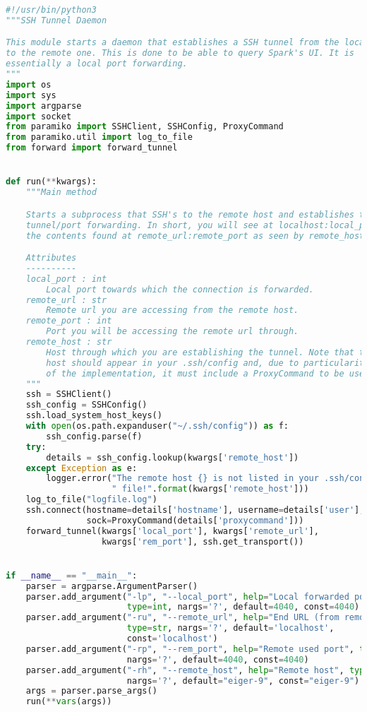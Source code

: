 \begin{lstlisting}[language=Python,caption={Python Script to Set Up a Port Forwarding Daemon.},label=code:evaluation:port-forward]
#!/usr/bin/python3
"""SSH Tunnel Daemon

This module starts a daemon that establishes a SSH tunnel from the local box
to the remote one. This is done to be able to query Spark's UI. It is
essentially a local port forwarding.
"""
import os
import sys
import argparse
import socket
from paramiko import SSHClient, SSHConfig, ProxyCommand
from paramiko.util import log_to_file
from forward import forward_tunnel


def run(**kwargs):
    """Main method

    Starts a subprocess that SSH's to the remote host and establishes the
    tunnel/port forwarding. In short, you will see at localhost:local_port
    the contents found at remote_url:remote_port as seen by remote_host.

    Attributes
    ----------
    local_port : int
        Local port towards which the connection is forwarded.
    remote_url : str
        Remote url you are accessing from the remote host.
    remote_port : int
        Port you will be accessing the remote url through.
    remote_host : str
        Host through which you are establishing the tunnel. Note that this
        host should appear in your .ssh/config and, due to particularities
        of the implementation, it must include a ProxyCommand to be used.
    """
    ssh = SSHClient()
    ssh_config = SSHConfig()
    ssh.load_system_host_keys()
    with open(os.path.expanduser("~/.ssh/config")) as f:
        ssh_config.parse(f)
    try:
        details = ssh_config.lookup(kwargs['remote_host'])
    except Exception as e:
        logger.error("The remote host {} is not listed in your .ssh/config" +
                     " file!".format(kwargs['remote_host']))
    log_to_file("logfile.log")
    ssh.connect(hostname=details['hostname'], username=details['user'],
                sock=ProxyCommand(details['proxycommand']))
    forward_tunnel(kwargs['local_port'], kwargs['remote_url'],
                   kwargs['rem_port'], ssh.get_transport())


if __name__ == "__main__":
    parser = argparse.ArgumentParser()
    parser.add_argument("-lp", "--local_port", help="Local forwarded port",
                        type=int, nargs='?', default=4040, const=4040)
    parser.add_argument("-ru", "--remote_url", help="End URL (from remote)",
                        type=str, nargs='?', default='localhost',
                        const='localhost')
    parser.add_argument("-rp", "--rem_port", help="Remote used port", type=int,
                        nargs='?', default=4040, const=4040)
    parser.add_argument("-rh", "--remote_host", help="Remote host", type=str,
                        nargs='?', default="eiger-9", const="eiger-9")
    args = parser.parse_args()
    run(**vars(args))
\end{lstlisting}

